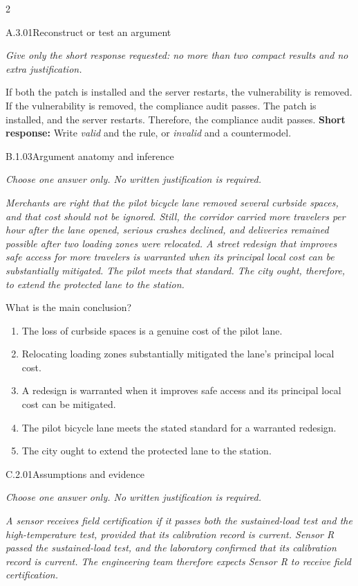 \documentclass[9pt]{extarticle}
\newcommand{\choice}[1]{\item #1}
\begin{document}
\CoreWorkArea
\FormBreak
{}
\begin{multicols}{2}
\begin{DenseCoreProblem}{A.3.01}{Reconstruct or test an argument}
{\scriptsize\textit{Give only the short response requested: no more than two compact results and no extra justification.}\par}
If both the patch is installed and the server restarts, the vulnerability is removed. If the vulnerability is removed, the compliance audit passes. The patch is installed, and the server restarts. Therefore, the compliance audit passes.
\textbf{Short response:} Write \emph{valid} and the rule, or \emph{invalid} and a countermodel.
\end{DenseCoreProblem}
\begin{DenseCoreProblem}{B.1.03}{Argument anatomy and inference}
{\scriptsize\textit{Choose one answer only. No written justification is required.}\par}
\emph{Merchants are right that the pilot bicycle lane removed several curbside spaces, and that cost should not be ignored. Still, the corridor carried more travelers per hour after the lane opened, serious crashes declined, and deliveries remained possible after two loading zones were relocated. A street redesign that improves safe access for more travelers is warranted when its principal local cost can be substantially mitigated. The pilot meets that standard. The city ought, therefore, to extend the protected lane to the station.}

What is the main conclusion?
\begin{enumerate}[label=(\alph*)]
  \choice{The loss of curbside spaces is a genuine cost of the pilot lane.}
  \choice{Relocating loading zones substantially mitigated the lane's principal local cost.}
  \choice{A redesign is warranted when it improves safe access and its principal local cost can be mitigated.}
  \choice{The pilot bicycle lane meets the stated standard for a warranted redesign.}
  \choice{The city ought to extend the protected lane to the station.}
\end{enumerate}
\end{DenseCoreProblem}
\columnbreak
\begin{DenseCoreProblem}{C.2.01}{Assumptions and evidence}
{\scriptsize\textit{Choose one answer only. No written justification is required.}\par}
\emph{A sensor receives field certification if it passes both the sustained-load test and the high-temperature test, provided that its calibration record is current. Sensor R passed the sustained-load test, and the laboratory confirmed that its calibration record is current. The engineering team therefore expects Sensor R to receive field certification.}


\end{DenseCoreProblem}
\end{multicols}
\end{document}
